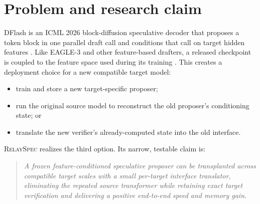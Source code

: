 \documentclass[10pt]{article}
\newcommand{\method}{\textsc{RelaySpec}}
\begin{document}
\section{Problem and research claim}

DFlash is an ICML 2026 block-diffusion speculative decoder that proposes a
token block in one parallel draft call and conditions that call on target
hidden features \cite{chen2026dflash}. Like EAGLE-3 and other feature-based
drafters, a released checkpoint is coupled to the feature space used during
its training \cite{li2025eagle3}. This creates a deployment choice for a new
compatible target model:

\begin{itemize}
  \item train and store a new target-specific proposer;
  \item run the original source model to reconstruct the old proposer's
        conditioning state; or
  \item translate the new verifier's already-computed state into the old
        interface.
\end{itemize}

\method{} realizes the third option. Its narrow, testable claim is:

\begin{quote}
\emph{A frozen feature-conditioned speculative proposer can be transplanted
across compatible target scales with a small per-target interface translator,
eliminating the repeated source transformer while retaining exact target
verification and delivering a positive end-to-end speed and memory gain.}
\end{quote}
\end{document}
